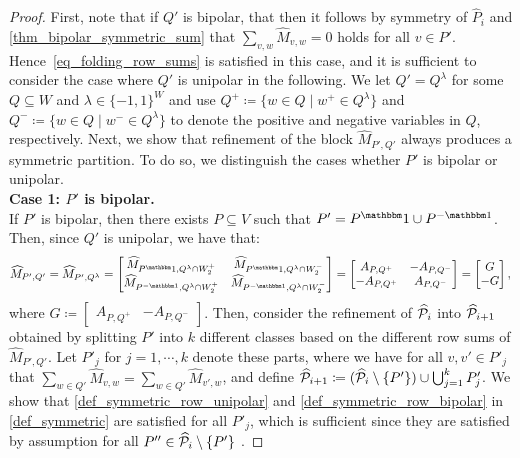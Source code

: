 \documentclass[pdflatex,sn-mathphys-num]{sn-jnl}%
\theoremstyle{thmstyleone}%
\theoremstyle{thmstylethree}%
\theoremstyle{thmstyletwo}%
\begin{document}
\begin{proof}
First, note that if $Q'$ is bipolar, that then it follows by symmetry of $\widehat{P}_i$ and \cref{thm_bipolar_symmetric_sum} that $\sum_{v,w} \widehat{M}_{v,w} = 0$ holds for all $v\in P'$. Hence~\eqref{eq_folding_row_sums} is satisfied in this case, and it is sufficient to consider the case where $Q'$ is unipolar in the following. We let $Q' = Q^\lambda$ for some $Q\subseteq W$ and $\lambda\in \{-1,1\}^W$ and use $Q^+ \coloneqq \{w\in Q \mid w^+\in Q^\lambda\}$ and $Q^- \coloneqq \{w\in Q \mid w^-\in Q^\lambda\}$ to denote the positive and negative variables in $Q$, respectively.
Next, we show that refinement of the block $\widehat{M}_{P',Q'}$ always produces a symmetric partition. To do so, we distinguish the cases whether $P'$ is bipolar or unipolar.\\
\noindent\textbf{Case 1: $P'$ is bipolar.}\\
    If $P'$ is bipolar, then there exists $P\subseteq V$ such that $P' = P^\onevec \cup P^{-\onevec}$. Then, since $Q'$ is unipolar, we have that:
        \begin{equation*}
            \widehat{M}_{P',Q'} = \widehat{M}_{P',Q^\lambda} = \begin{bmatrix}
            \widehat{M}_{P^\onevec,Q^\lambda \cap W^+_2} & \widehat{M}_{P^\onevec,Q^\lambda \cap W^-_2} \\
            \widehat{M}_{P^{-\onevec},Q^\lambda \cap W^+_2} & \widehat{M}_{P^{-\onevec},Q^\lambda \cap W^-_2} 
        \end{bmatrix} = \begin{bmatrix}
            A_{P,Q^+} & -A_{P,Q^-} \\
            -A_{P,Q^+} & A_{P,Q^-} 
        \end{bmatrix} = \begin{bmatrix}
            G \\
            -G
        \end{bmatrix},
        \end{equation*}
        where $G\coloneqq \begin{bmatrix}
            A_{P,Q^+} & -A_{P,Q^-}
        \end{bmatrix}$.
        Then, consider the refinement of $\widehat{\mathcal{P}}_i$ into $\widehat{\mathcal{P}}_{i+1}$ obtained by splitting $P'$ into $k$ different classes based on the different row sums of $\widehat{M}_{P',Q'}$. Let $P'_j$ for $j=1,\cdots,k$ denote these parts, where we have for all $v,v'\in P'_j$ that $\sum_{w\in Q'} \widehat{M}_{v,w} = \sum_{w\in Q'} \widehat{M}_{v',w}$, and define $\widehat{\MP}_{i+1} \coloneqq (\widehat{\MP}_i \setminus \{P'\} )\cup \bigcup_{j=1}^k P'_j$. We show that \ref{def_symmetric_row_unipolar} and \ref{def_symmetric_row_bipolar} in \cref{def_symmetric} are satisfied for all $P'_j$, which is sufficient since they are satisfied by assumption for all $P''\in \widehat{\mathcal{P}}_i \setminus \{P'\}$ .


\end{proof}
\end{document}
